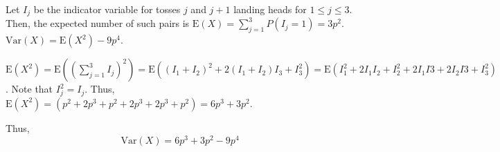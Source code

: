 Let $I_{j}$ be the indicator variable for tosses $j$ and $j+1$ landing heads for
$1 \leq j \leq 3$. Then, the expected number of such pairs is $\text{E}(X) =
\sum_{j=1}^{3}P(I_{j}=1) = 3p^{2}$. $\text{Var}(X) = \text{E}(X^{2}) -
9p^{4}$.

$\text{E}(X^{2}) = \text{E}((\sum_{j=1}^{3}I_{j})^{2}) = \text{E}((I_{1} + I_
{2})^{2} + 2(I_{1}+I_{2})I_{3} + I_{3}^{2}) = \text{E}(I_{1}^{2} + 2I_{1}I_{2}
+ I_{2}^{2} + 2I_{1}I{3} + 2I_{2}I{3} + I_{3}^{2})$. Note that $I_{j}^{2} = I_
{j}$. Thus, $\text{E}(X^{2}) = (p^{2} + 2p^{3} + p^{2} + 2p^{3} + 2p^{3} + p^
{2}) = 6p^{3} + 3p^{2}$.

Thus, $$\text{Var}(X)= 6p^{3} + 3p^{2} - 9p^{4}$$